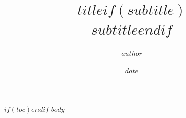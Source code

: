 \documentclass[$for(classoption)$$classoption$$sep$,$endfor$]{$documentclass$}
\title{$title$$if(subtitle)$\\[0.5em]{\large $subtitle$}$endif$}
\author{$author$}
\date{$date$}
\begin{document}
\frontmatter
\maketitle
$if(toc)$\tableofcontents$endif$
\mainmatter
$body$
\end{document}

